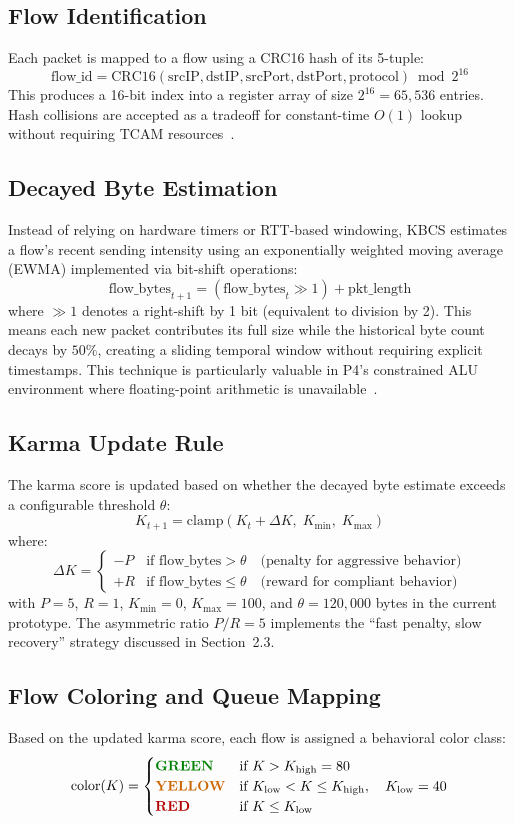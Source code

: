 \documentclass[12pt,a4paper]{report}
\begin{document}
\subsection{Flow Identification}
Each packet is mapped to a flow using a CRC16 hash of its 5-tuple:
\[
\text{flow\_id} = \text{CRC16}(\text{srcIP}, \text{dstIP}, \text{srcPort}, \text{dstPort}, \text{protocol}) \bmod 2^{16}
\]
This produces a 16-bit index into a register array of size $2^{16} = 65{,}536$ entries. Hash collisions are accepted as a tradeoff for constant-time $O(1)$ lookup without requiring TCAM resources~\cite{kbcs_srs}.

\subsection{Decayed Byte Estimation}
Instead of relying on hardware timers or RTT-based windowing, KBCS estimates a flow's recent sending intensity using an exponentially weighted moving average (EWMA) implemented via bit-shift operations:
\[
\text{flow\_bytes}_{t+1} = (\text{flow\_bytes}_t \gg 1) + \text{pkt\_length}
\]
where $\gg 1$ denotes a right-shift by 1 bit (equivalent to division by 2). This means each new packet contributes its full size while the historical byte count decays by $50\%$, creating a sliding temporal window without requiring explicit timestamps. This technique is particularly valuable in P4's constrained ALU environment where floating-point arithmetic is unavailable~\cite{kbcs_design}.

\subsection{Karma Update Rule}
The karma score is updated based on whether the decayed byte estimate exceeds a configurable threshold $\theta$:
\[
K_{t+1} = \text{clamp}\left(K_t + \Delta K, \; K_{\min}, \; K_{\max}\right)
\]
where:
\[
\Delta K = \begin{cases}
-P & \text{if } \text{flow\_bytes} > \theta \quad \text{(penalty for aggressive behavior)} \\
+R & \text{if } \text{flow\_bytes} \leq \theta \quad \text{(reward for compliant behavior)}
\end{cases}
\]
with $P = 5$, $R = 1$, $K_{\min} = 0$, $K_{\max} = 100$, and $\theta = 120{,}000$ bytes in the current prototype. The asymmetric ratio $P/R = 5$ implements the ``fast penalty, slow recovery'' strategy discussed in Section~2.3.

\subsection{Flow Coloring and Queue Mapping}
Based on the updated karma score, each flow is assigned a behavioral color class:
\[
\text{color}(K) = \begin{cases}
\textcolor{green!50!black}{\textbf{GREEN}} & \text{if } K > K_{\text{high}} = 80 \\
\textcolor{orange!80!black}{\textbf{YELLOW}} & \text{if } K_{\text{low}} < K \leq K_{\text{high}}, \quad K_{\text{low}} = 40 \\
\textcolor{red!70!black}{\textbf{RED}} & \text{if } K \leq K_{\text{low}}
\end{cases}
\]
\end{document}
